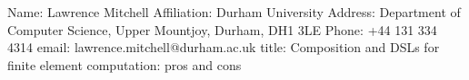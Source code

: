 Name: Lawrence Mitchell
Affiliation: Durham University
Address: Department of Computer Science, Upper Mountjoy, Durham, DH1 3LE
Phone: +44 131 334 4314
email: lawrence.mitchell@durham.ac.uk
title: Composition and DSLs for finite element computation: pros and cons
